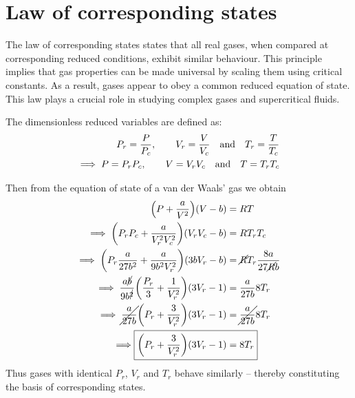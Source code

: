 \section{Law of corresponding states}
	The law of corresponding states states that all real gases, when compared at corresponding reduced conditions, exhibit similar behaviour. This principle implies that gas properties can be made universal by scaling them using critical constants. As a result, gases appear to obey a common reduced equation of state. This law plays a crucial role in studying complex gases and supercritical fluids.
	
	The dimensionless reduced variables are defined as:
	\begin{align*}
		P_r=\dfrac{P}{P_c},\qq{}V_r=\dfrac{V}{V_c}\qq{and}T_r=\dfrac{T}{T_c} \\
		\implies P=P_rP_c,\qq{}V=V_rV_c\qq{and}T=T_rT_c
	\end{align*}
	
	Then from the equation of state of a van der Waals' gas we obtain
	\begin{align*}
		\qty(P+\dfrac{a}{V^2})\qty(V-b)&=RT \\
		\implies\qty(P_rP_c+\dfrac{a}{V_r^2V_c^2})\qty(V_rV_c-b)&=RT_rT_c \\
		\implies\qty(P_r\dfrac{a}{27b^2}+\dfrac{a}{9b^2V_r^2})\qty(3bV_r-b)&=\cancel{R}T_r\dfrac{8a}{27\cancel{R}b} \\
		\implies\dfrac{a\cancel{b}}{9b^{\cancel{2}}}\qty(\dfrac{P_r}{3}+\dfrac{1}{V_r^2})\qty(3V_r-1)&=\dfrac{a}{27b}8T_r \\
		\implies\cancel{\dfrac{a}{27b}}\qty(P_r+\dfrac{3}{V_r^2})\qty(3V_r-1)&=\cancel{\dfrac{a}{27b}}8T_r \\
		\implies\Aboxed{\qty(P_r+\dfrac{3}{V_r^2})\qty(3V_r-1)&=8T_r}
	\end{align*}
	Thus gases with identical $P_r$, $V_r$ and $T_r$ behave similarly -- thereby constituting the basis of corresponding states.